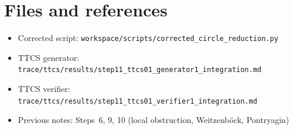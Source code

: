 \section{Files and references}
\begin{itemize}
\item Corrected script: \texttt{workspace/scripts/corrected\_circle\_reduction.py}
\item TTCS generator: \texttt{trace/ttcs/results/step11\_ttcs01\_generator1\_integration.md}
\item TTCS verifier: \texttt{trace/ttcs/results/step11\_ttcs01\_verifier1\_integration.md}
\item Previous notes: Steps~6, 9, 10 (local obstruction, Weitzenb\"ock, Pontryagin)
\end{itemize}
